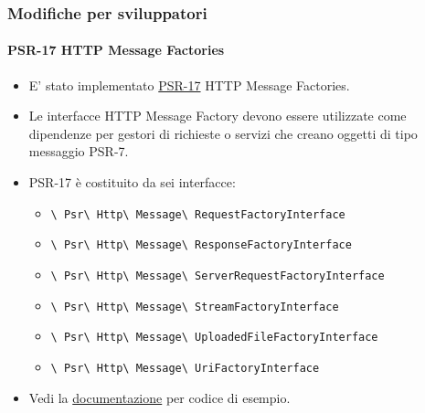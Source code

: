 
\begin{frame}[fragile]
	\frametitle{Modifiche per sviluppatori}
	\framesubtitle{PSR-17 HTTP Message Factories}

	\begin{itemize}
		\item E' stato implementato \href{https://www.php-fig.org/psr/psr-17/}{PSR-17}
			HTTP Message Factories.
		\item Le interfacce HTTP Message Factory devono essere utilizzate come dipendenze
			per gestori di richieste o servizi che creano oggetti di tipo messaggio PSR-7.
		\item PSR-17 è costituito da sei interfacce:

			\begin{itemize}\smaller
				\item \texttt{\textbackslash
					Psr\textbackslash
					Http\textbackslash
					Message\textbackslash
					RequestFactoryInterface}
				\item \texttt{\textbackslash
					Psr\textbackslash
					Http\textbackslash
					Message\textbackslash
					ResponseFactoryInterface}
				\item \texttt{\textbackslash
					Psr\textbackslash
					Http\textbackslash
					Message\textbackslash
					ServerRequestFactoryInterface}
				\item \texttt{\textbackslash
					Psr\textbackslash
					Http\textbackslash
					Message\textbackslash
					StreamFactoryInterface}
				\item \texttt{\textbackslash
					Psr\textbackslash
					Http\textbackslash
					Message\textbackslash
					UploadedFileFactoryInterface}
				\item \texttt{\textbackslash
					Psr\textbackslash
					Http\textbackslash
					Message\textbackslash
					UriFactoryInterface}

			\end{itemize}\normalsize

		\item Vedi la
			\href{https://docs.typo3.org/c/typo3/cms-core/master/en-us/Changelog/10.1/Feature-89018-ProvideImplementationForPSR-17HTTPMessageFactories.html}{documentazione}
			per codice di esempio.

	\end{itemize}

\end{frame}


